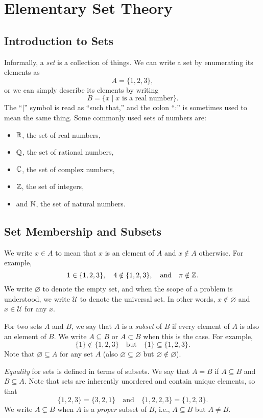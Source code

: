 \chapter{Elementary Set Theory}

\section{Introduction to Sets}
Informally, a \emph{set} is a collection of things.
We can write a set by enumerating its elements as
\[A = \{1, 2, 3\},\]
or we can simply describe its elements by writing
\[B = \{x \mid x \text{ is a real number}\}.\]
The ``$\mid$'' symbol is read as ``such that,''
and the colon ``:'' is sometimes used to mean the
same thing. Some commonly used sets of numbers are:
\begin{itemize}
  \item $\mathbb{R}$, the set of real numbers,
  \item $\mathbb{Q}$, the set of rational numbers,
  \item $\mathbb{C}$, the set of complex numbers,
  \item $\mathbb{Z}$, the set of integers,
  \item and $\mathbb{N}$, the set of natural numbers.
\end{itemize}

\section{Set Membership and Subsets}
We write $x \in A$ to mean that $x$ is an element of $A$
and $x \notin A$ otherwise.
For example,
\[
  1 \in \{1, 2, 3\}, \quad
  4 \notin \{1, 2, 3\}, \quad
  \text{and} \quad
  \pi \notin \mathbb{Z}.
\]
We write $\varnothing$ to denote the empty set, and when
the scope of a problem is understood,
we write $\mathcal{U}$ to denote the universal set.
In other words, $x \notin \varnothing$ and
$x \in \mathcal{U}$ for any $x$.

For two sets $A$ and $B$, we say that $A$ is a
\emph{subset} of $B$ if every element of $A$ is also
an element of $B$. We write $A \subseteq B$ or
$A \subset B$ when this is the case. For example,
\[\{1\} \notin \{1, 2, 3\} \quad \text{but} \quad \{1\} \subseteq \{1, 2, 3\}.\]
Note that $\varnothing \subseteq A$ for any set $A$
(also $\varnothing \subseteq \varnothing$ but
$\varnothing \notin \varnothing$).

\emph{Equality} for sets is defined in terms of subsets. We
say that $A = B$ if $A \subseteq B$ and $B \subseteq A$.
Note that sets are inherently unordered and contain
unique elements, so that
\[\{1, 2, 3\} = \{3, 2, 1\} \quad \text{and} \quad \{1, 2, 2, 3\} = \{1, 2, 3\}.\]
We write
$A \subsetneq B$ when $A$ is a \emph{proper} subset of
$B$, i.e., $A \subseteq B$ but $A \neq B$.

